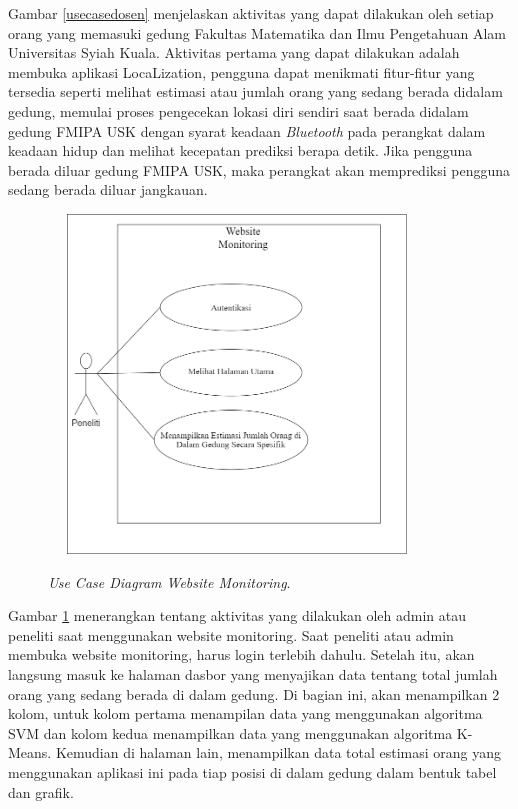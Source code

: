 \par Gambar \ref{usecasedosen} menjelaskan aktivitas yang dapat dilakukan oleh setiap orang yang memasuki gedung Fakultas Matematika dan Ilmu Pengetahuan Alam Universitas Syiah Kuala. Aktivitas pertama yang dapat dilakukan adalah membuka aplikasi LocaLization, pengguna dapat menikmati fitur-fitur yang tersedia seperti melihat estimasi atau jumlah orang yang sedang berada didalam gedung, memulai proses pengecekan lokasi diri sendiri saat berada didalam gedung FMIPA USK dengan syarat keadaan \textit{Bluetooth} pada perangkat dalam keadaan hidup dan melihat kecepatan prediksi berapa detik. Jika pengguna berada diluar gedung FMIPA USK, maka perangkat akan memprediksi pengguna sedang berada diluar jangkauan.

\begin{figure}[H]
	\center
	\shadowbox
	{\includegraphics [width=10cm, height=9cm]{gambar/model/usecaseWebMonitoring}}
	\caption{\textit{Use Case Diagram Website Monitoring}.}
	\label{usecasewebmonitoring}
\end{figure}

Gambar \ref{usecasewebmonitoring} menerangkan tentang aktivitas yang dilakukan oleh admin atau peneliti saat  menggunakan website monitoring. Saat peneliti atau admin membuka website monitoring, harus login terlebih dahulu. Setelah itu, akan langsung masuk ke halaman dasbor yang menyajikan data tentang total jumlah orang yang sedang berada di dalam gedung. Di bagian ini, akan menampilkan 2 kolom, untuk kolom pertama menampilan data yang menggunakan algoritma SVM dan kolom kedua menampilkan data yang menggunakan algoritma K-Means. Kemudian di halaman lain, menampilkan data total estimasi orang yang menggunakan aplikasi ini pada tiap posisi di dalam gedung dalam bentuk tabel dan grafik.


